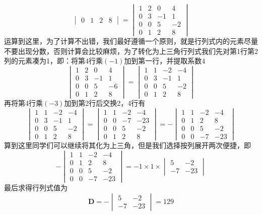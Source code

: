\begin{example}
$$\begin{vmatrix}
		0 & 1 & 2 & 8
	   \end{vmatrix}=\begin{vmatrix}
		1 & 2 & 0 & 4\\
		0 & 3 & -1 & 1\\
		0 & 0 & 5 & -2\\
		0 & 1 & 2 & 8
	   \end{vmatrix}$$运算到这里，为了计算不出错，我们最好遵循一个原则，就是行列式内的元素尽量不要出现分数，否则计算会比较麻烦，为了转化为上三角行列式我们先对第1行第2列的元素凑为1，即：将第4行乘$(-1)$加到第一行，并提取系数4$$\begin{vmatrix}
		1 & 2 & 0 & 4\\
		0 & 3 & -1 & 1\\
		0 & 0 & 5 & -6\\
		0 & 1 & 2 & 8
	   \end{vmatrix}=\begin{vmatrix}
		1 & 1 & -2 & -4\\
		0 & 3 & -1 & 1\\
		0 & 0 & 5 & -2\\
		0 & 1 & 2 & 8
	   \end{vmatrix}$$再将第4行乘$(-3)$加到第2行后交换2，4行有
	   $$\begin{vmatrix}
		1 & 1 & -2 & -4\\
		0 & 3 & -1 & 1\\
		0 & 0 & 5 & -2\\
		0 & 1 & 2 & 8
	   \end{vmatrix}=\begin{vmatrix}
		1 & 1 & -2 & -4\\
		0 & 0 & -7 & -23\\
		0 & 0 & 5 & -2\\
		0 & 1 & 2 & 8
	   \end{vmatrix}=-\begin{vmatrix}
		1 & 1 & -2 & -4\\
		0 & 1 & 2 & 8\\
		0 & 0 & 5 & -2\\
		0 & 0 & -7 & -23
	   \end{vmatrix}$$算到这里同学们可以继续将其化为上三角，但是我们选择按列展开两次便捷，即$$-\begin{vmatrix}
		1 & 1 & -2 & -4\\
		0 & 1 & 2 & 8\\
		0 & 0 & 5 & -2\\
		0 & 0 & -7 & -23
	   \end{vmatrix}=-1\times 1\times \begin{vmatrix}
		5 & -2\\
		-7 & -23
	   \end{vmatrix}$$最后求得行列式值为$$\mathbf{D}=-\begin{vmatrix}
		5 & -2\\
		-7 & -23
	   \end{vmatrix}=129$$
\end{example}

